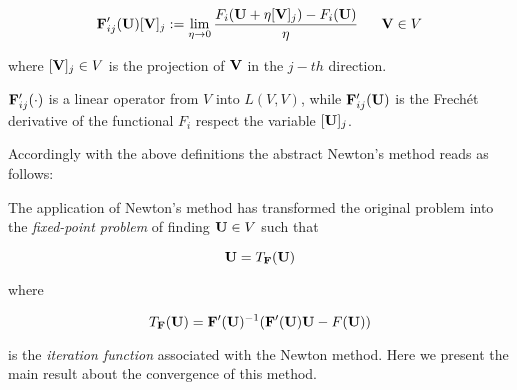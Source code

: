 \begin{equation}
\vect{F}'_{ij}(\vect{U})[\vect{V}]_j := \lim_{\eta \to 0}\dfrac{F_i(\vect{U}+\eta [\vect{V}]_j)-F_i(\vect{U})}{\eta}  \psp{10} \vect{V} \in V
\end{equation}

where $[\mathbf{V}]_j \in V$ is the projection  of  $\mathbf{V}$ in the $j-th$ direction. 

$\mathbf{F}'_{ij}(\cdot)$ is a linear operator from $V$ into $L(V,V)$, while $\mathbf{F}'_{ij}(\mathbf{U})$ is the Frech\'et derivative of the functional $F_i$ respect the variable $[\mathbf{U}]_j$.

Accordingly with the above definitions the abstract Newton's method reads as follows:


\vspace{0.3cm}
The application of Newton's method has transformed the original problem  into the \textit{fixed-point problem} of finding $\mathbf{U} \in V$ such that

\begin{equation}
\label{eq: fixed point U}
\mathbf{U} = T_{\mathbf{F}}(\mathbf{U})
\end{equation}

where 

\begin{equation}
\label{eq: iteration function}
T_{\mathbf{F}}(\mathbf{U}) = \mathbf{F}'(\mathbf{U})^{-1}(\mathbf{F}'(\mathbf{U})\mathbf{U}-F(\mathbf{U}))
\end{equation}

is the \textit{iteration function} associated with the Newton method.
Here we present the main result about the convergence of this method.

